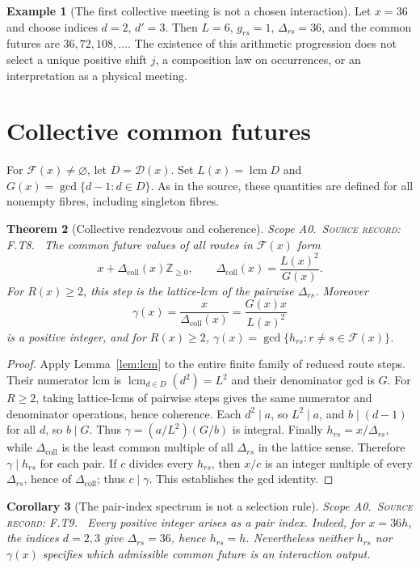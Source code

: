 \documentclass[11pt,oneside,openany]{book}
\newtheorem{theorem}{Theorem}[chapter]
\newtheorem{corollary}[theorem]{Corollary}
\theoremstyle{definition}
\newtheorem{example}[theorem]{Example}
\theoremstyle{remark}
\newcommand{\Z}{\mathbb{Z}}
\newcommand{\Fx}{\mathcal{F}}
\newcommand{\Dx}{\mathcal{D}}
\newcommand{\lcmop}{\operatorname{lcm}}
\newcommand{\gcdop}{\operatorname{gcd}}
\newcommand{\scope}[1]{\textsf{\small Scope #1.}\ }
\newcommand{\record}[1]{\textup{\textsc{Source record: #1.}}\ }
\newcommand{\Del}{\Delta}
\begin{document}
\begin{example}[The first collective meeting is not a chosen interaction]
Let \(x=36\) and choose indices \(d=2\), \(d'=3\). Then \(L=6\), \(g_{rs}=1\), \(\Del_{rs}=36\), and the common futures are \(36,72,108,\ldots\). The existence of this arithmetic progression does not select a unique positive shift \(j\), a composition law on occurrences, or an interpretation as a physical meeting.
\end{example}

\section{Collective common futures}
For \(\Fx(x)\ne\varnothing\), let \(D=\Dx(x)\). Set \(L(x)=\lcmop D\) and \(G(x)=\gcdop\{d-1:d\in D\}\). As in the source, these quantities are defined for all nonempty fibres, including singleton fibres.
\begin{theorem}[Collective rendezvous and coherence]\label{thm:coll}
\scope{A0}\record{F.T8} The common future values of all routes in \(\Fx(x)\) form
\begin{equation}\label{eq:delta-coll}
 x+\Del_{\mathrm{coll}}(x)\Z_{\ge0},\qquad
 \Del_{\mathrm{coll}}(x)=\frac{L(x)^2}{G(x)}.
\end{equation}
For \(R(x)\ge2\), this step is the lattice-lcm of the pairwise \(\Del_{rs}\). Moreover
\[
 \gamma(x)=\frac{x}{\Del_{\mathrm{coll}}(x)}=\frac{G(x)x}{L(x)^2}
\]
is a positive integer, and for \(R(x)\ge2\), \(\gamma(x)=\gcdop\{h_{rs}:r\ne s\in\Fx(x)\}\).
\end{theorem}
\begin{proof}
Apply Lemma~\ref{lem:lcm} to the entire finite family of reduced route steps. Their numerator lcm is \(\lcmop_{d\in D}(d^2)=L^2\) and their denominator gcd is \(G\). For \(R\ge2\), taking lattice-lcms of pairwise steps gives the same numerator and denominator operations, hence coherence. Each \(d^2\mid a\), so \(L^2\mid a\), and \(b\mid(d-1)\) for all \(d\), so \(b\mid G\). Thus \(\gamma=(a/L^2)(G/b)\) is integral. Finally \(h_{rs}=x/\Del_{rs}\), while \(\Del_{\mathrm{coll}}\) is the least common multiple of all \(\Del_{rs}\) in the lattice sense. Therefore \(\gamma\mid h_{rs}\) for each pair. If \(c\) divides every \(h_{rs}\), then \(x/c\) is an integer multiple of every \(\Del_{rs}\), hence of \(\Del_{\mathrm{coll}}\); thus \(c\mid\gamma\). This establishes the gcd identity.
\end{proof}

\begin{corollary}[The pair-index spectrum is not a selection rule]\label{cor:pairspec}
\scope{A0}\record{F.T9} Every positive integer arises as a pair index. Indeed, for \(x=36h\), the indices \(d=2,3\) give \(\Del_{rs}=36\), hence \(h_{rs}=h\). Nevertheless neither \(h_{rs}\) nor \(\gamma(x)\) specifies which admissible common future is an interaction output.
\end{corollary}
\end{document}
